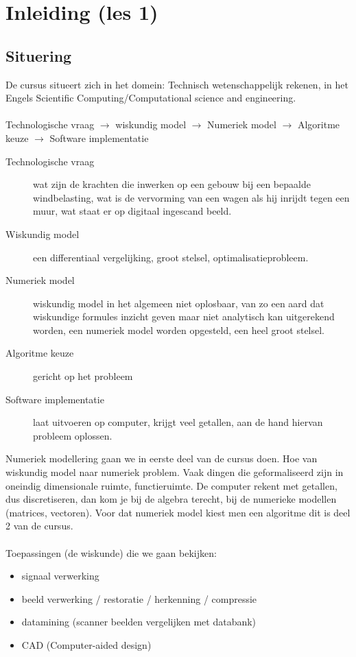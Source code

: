 \chapter{Inleiding (les 1)}
\section{Situering}
De cursus situeert zich in het domein: Technisch wetenschappelijk rekenen, in het Engels Scientific Computing/Computational science and engineering.
\\\\
Technologische vraag $\rightarrow$ wiskundig model $\rightarrow$ Numeriek model $\rightarrow$ Algoritme keuze $\rightarrow$ Software implementatie

\begin{description}
	\item [Technologische vraag] wat zijn de krachten die inwerken op een gebouw bij een bepaalde windbelasting, wat is de vervorming van een wagen als hij inrijdt tegen een muur, wat staat er op digitaal ingescand beeld.

	\item [Wiskundig model] een differentiaal vergelijking, groot stelsel, optimalisatieprobleem.

	\item [Numeriek model] wiskundig model in het algemeen niet oplosbaar, van zo een aard dat wiskundige formules inzicht geven maar niet analytisch kan uitgerekend worden, een numeriek model worden opgesteld, een heel groot stelsel.

	\item [Algoritme keuze] gericht op het probleem

	\item [Software implementatie] laat uitvoeren op computer, krijgt veel getallen, aan de hand hiervan probleem oplossen.
\end{description}
Numeriek modellering gaan we in eerste deel van de cursus doen. Hoe van wiskundig model naar numeriek problem. Vaak dingen die geformaliseerd zijn in oneindig dimensionale ruimte, functieruimte. De computer rekent met getallen, dus discretiseren, dan kom je bij de algebra terecht, bij de numerieke modellen (matrices, vectoren). Voor dat numeriek model kiest men een algoritme dit is deel 2 van de cursus.
\\\\
Toepassingen (de wiskunde) die we gaan bekijken:
\begin{itemize}
	\item signaal verwerking
	\item beeld verwerking / restoratie / herkenning / compressie
	\item datamining (scanner beelden vergelijken met databank)
	\item CAD (Computer-aided design)
\end{itemize}

